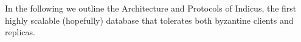 In the following we outline the Architecture and Protocols of Indicus, the first highly scalable (hopefully) database that tolerates both byzantine clients and replicas.
